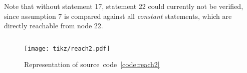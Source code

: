 \documentclass[british]{article}
\newenvironment{code}{\captionsetup{type=listing}}{}
\newcommand\prv{bc}
\newcommand\m[1]{\texttt{#1}}
\begin{document}
Note that without statement 17, statement 22 could currently not be verified,
since assumption 7 is compared against all \emph{constant} statements, which are
directly reachable from node 22.
\pagebreak{}

\begin{code}
\label{code:reach2}
\inputminted[linenos]{\prv}{examples/reach2.prove}
\end{code}

\begin{figure}[!h]
\caption{Representation of source~code~\ref{code:reach2}}\label{fig:reach2}
\centering
\texttt{[image: tikz/reach2.pdf]}
\end{figure}

\pagebreak{}

%
%
%

\begingroup
{}
\setlength\bibitemsep{10pt}
\printbibliography\
\endgroup
\end{document}
